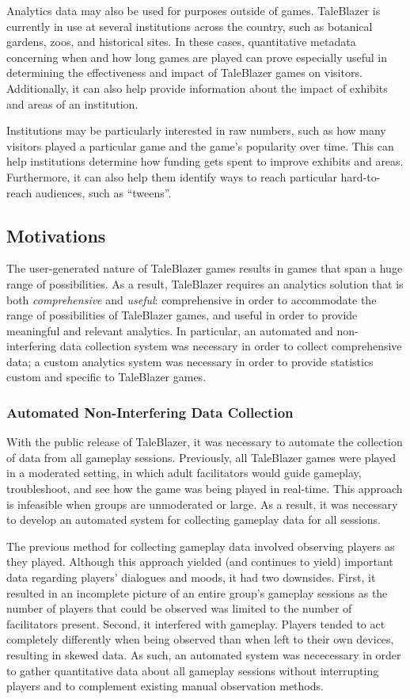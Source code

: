 Analytics data may also be used for purposes outside of games. TaleBlazer is currently in use at several institutions across the country, such as botanical gardens, zoos, and historical sites. In these cases, quantitative metadata concerning when and how long games are played can prove especially useful in determining the effectiveness and impact of TaleBlazer games on visitors. Additionally, it can also help provide information about the impact of exhibits and areas of an institution. 

Institutions may be particularly interested in raw numbers, such as how many visitors played a particular game and the game's popularity over time. This can help institutions determine how funding gets spent to improve exhibits and areas. Furthermore, it can also help them identify ways to reach particular hard-to-reach audiences, such as ``tweens''.

\subsection{Motivations}
The user-generated nature of TaleBlazer games results in games that span a huge range of possibilities. As a result, TaleBlazer requires an analytics solution that is both \textit{comprehensive} and \textit{useful}: comprehensive in order to accommodate the range of possibilities of TaleBlazer games, and useful in order to provide meaningful and relevant analytics. In particular, an automated and non-interfering data collection system was necessary in order to collect comprehensive data; a custom analytics system was necessary in order to provide statistics custom and specific to TaleBlazer games.

\subsubsection{Automated Non-Interfering Data Collection}

With the public release of TaleBlazer, it was necessary to automate the collection of data from all gameplay sessions. Previously, all TaleBlazer games were played in a moderated setting, in which adult facilitators would guide gameplay, troubleshoot, and see how the game was being played in real-time. This approach is infeasible when groups are unmoderated or large. As a result, it was necessary to develop an automated system for collecting gameplay data for all sessions.

The previous method for collecting gameplay data involved observing players as they played. Although this approach yielded (and continues to yield) important data regarding players' dialogues and moods, it had two downsides. First, it resulted in an incomplete picture of an entire group's gameplay sessions as the number of players that could be observed was limited to the number of facilitators present. Second, it interfered with gameplay. Players tended to act completely differently when being observed than when left to their own devices, resulting in skewed data. As such, an automated system was nececessary in order to gather quantitative data about all gameplay sessions without interrupting players and to complement existing manual observation methods.

